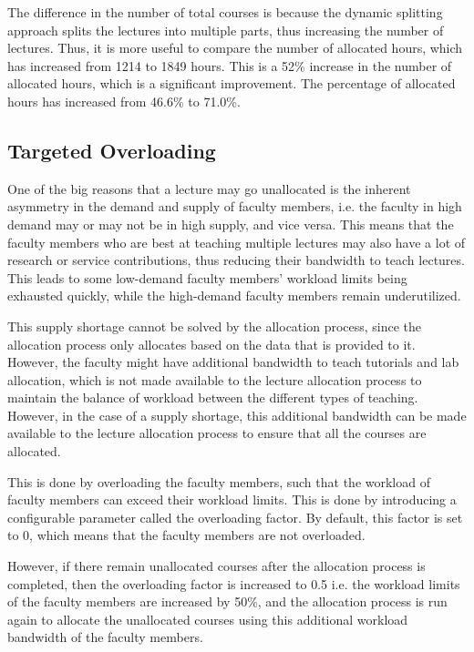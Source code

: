 The difference in the number of total courses is because the dynamic splitting approach splits the lectures into multiple parts, thus increasing the number of lectures. Thus, it is more useful to compare the number of allocated hours, which has increased from 1214 to 1849 hours. This is a 52\% increase in the number of allocated hours, which is a significant improvement. The percentage of allocated hours has increased from 46.6\% to 71.0\%.


\subsection{Targeted Overloading}
\label{sec:targeted_overloading}

One of the big reasons that a lecture may go unallocated is the inherent asymmetry in the demand and supply of faculty members, i.e. the faculty in high demand may or may not be in high supply, and vice versa. This means that the faculty members who are best at teaching multiple lectures may also have a lot of research or service contributions, thus reducing their bandwidth to teach lectures. This leads to some low-demand faculty members' workload limits being exhausted quickly, while the high-demand faculty members remain underutilized.

This supply shortage cannot be solved by the allocation process, since the allocation process only allocates based on the data that is provided to it. However, the faculty might have additional bandwidth to teach tutorials and lab allocation, which is not made available to the lecture allocation process to maintain the balance of workload between the different types of teaching. However, in the case of a supply shortage, this additional bandwidth can be made available to the lecture allocation process to ensure that all the courses are allocated.

This is done by overloading the faculty members, such that the workload of faculty members can exceed their workload limits. This is done by introducing a configurable parameter called the overloading factor. By default, this factor is set to 0, which means that the faculty members are not overloaded.

However, if there remain unallocated courses after the allocation process is completed, then the overloading factor is increased to 0.5 i.e. the workload limits of the faculty members are increased by 50\%, and the allocation process is run again to allocate the unallocated courses using this additional workload bandwidth of the faculty members.

